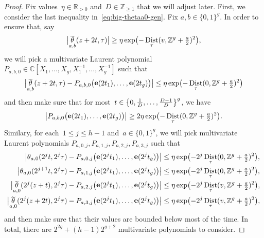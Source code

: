 \documentclass[12pt,oneside]{amsart}
\numberwithin{equation}{section}
\theoremstyle{definition}
\newcommand{\Z}{\mathbb{Z}}
\newcommand{\R}{\mathbb{R}}
\newcommand{\C}{\mathbb{C}}
\DeclareMathOperator{\Dist}{Dist}
\DeclareMathOperator{\thetatilde}{\rlap{\raisebox{-0.1ex}{$\widetilde{\phantom{\,t}}$}}\theta}
\DeclareMathOperator{\e}{\mathbf{e}}
\DeclarePairedDelimiter{\abs}{|}{|}
\DeclarePairedDelimiter{\paren}{(}{)}
\DeclarePairedDelimiter{\set}{\{}{\}}
\begin{document}
\begin{proof}
  Fix values~$\eta\in \R_{>0}$ and~$D\in \Z_{\geq 1}$ that we will adjust
  later. First, we consider the last inequality
  in~\eqref{eq:big-thetaa0-gen}. Fix $a,b\in \{0,1\}^g$. In order to ensure
  that, say
  \begin{displaymath}
    \abs[\big]{\thetatilde_{a,b}(z+2t, \tau)}
    \geq \eta \exp\paren[\big]{-\Dist_\tau(v, \Z^g + \tfrac a2)^2},
  \end{displaymath}
  we will pick a multivariate Laurent polynomial
  $P_{a,b,0}\in \C[X_1,\ldots,X_g, X_1^{-1},\ldots,X_g^{-1}]$ such that
  \begin{displaymath}
    \abs[\big]{\thetatilde_{a,b}(z+2t,\tau) - P_{a,b,0}\paren[\big]{\e(2t_1),\ldots, \e(2t_g)}}
    \leq \eta \exp\paren[\big]{-\Dist_\tau(0, \Z^g + \tfrac a2)^2}
  \end{displaymath}
  and then make sure that for most~$t \in \set[\big]{0,\tfrac 1D,\ldots,\tfrac{D-1}{D}}^g$, we have
  \begin{displaymath}
    \abs[\big]{P_{a,b,0}\paren[\big]{\e(2t_1),\ldots, \e(2t_g)}}\geq 2\eta
    \exp\paren[\big]{-\Dist_\tau(0, \Z^g + \tfrac a2)^2}.
  \end{displaymath}
  Similary, for each~$1\leq j\leq h-1$ and~$a\in \{0,1\}^g$, we will pick
  multivariate Laurent polynomials $P_{a,0,j}, P_{a,1,j}, P_{a,2,j}, P_{a,3,j}$
  such that
  \begin{align*}
    \abs[\big]{\theta_{a,0}(2^jt,2^j\tau) - P_{a,0,j}\paren[\big]{\e(2^jt_1),\ldots, \e(2^jt_g)}}
    &\leq \eta \exp\paren[\big]{-2^j\Dist_\tau(0, \Z^g + \tfrac a2)^2}, \\
    \abs[\big]{\theta_{a,0}(2^{j+1}t,2^j\tau) - P_{a,1,j}\paren[\big]{\e(2^jt_1),\ldots, \e(2^jt_g)}}
    &\leq \eta \exp\paren[\big]{-2^j\Dist_\tau(0, \Z^g + \tfrac a2)^2}, \\
    \abs[\big]{\thetatilde_{a,0}(2^j(z+t),2^j\tau) - P_{a,2,j}\paren[\big]{\e(2^jt_1),\ldots, \e(2^jt_g)}}
    &\leq \eta \exp\paren[\big]{-2^j\Dist_\tau(v, \Z^g + \tfrac a2)^2}, \\
    \abs[\big]{\thetatilde_{a,0}(2^j(z+2t),2^j\tau) - P_{a,3,j}\paren[\big]{\e(2^jt_1),\ldots, \e(2^jt_g)}}
    &\leq \eta \exp\paren[\big]{-2^j\Dist_\tau(v, \Z^g + \tfrac a2)^2},
  \end{align*}
  and then make sure that their values are bounded below most of the time.  In
  total, there are $2^{2g} + (h-1)2^{g+2}$ multivariate polynomials to
  consider.


\end{proof}
\end{document}
